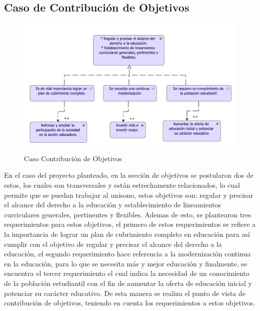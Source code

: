
\subsection{Caso  de Contribución de Objetivos}
\begin{figure}[h!]
	\centering
	\includegraphics[width=1.0\linewidth]{imgs/motivacion/contriObjetivos/contriObjetivos.pdf}
	\caption{Caso Contribución de Objetivos}
\end{figure}

En el caso del proyecto planteado, en la sección de objetivos se postularon dos de estos, los cuales son transversales y están estrechamente relacionados, lo cual permite que se puedan trabajar al unisono, estos objetivos son: regular y precisar el alcance del derecho a la educación y establecimiento de lineamientos curriculares generales, pertinentes y flexibles. Ademas de esto, se plantearon tres requerimientos para estos objetivos, el primero de estos requerimientos se refiere a la importancia de lograr un plan de cubrimiento completo en educación para así cumplir con el objetivo de regular y precisar el alcance del derecho a la educación, el segundo requerimiento hace referencia a la modernización continua en la educación, para lo que se necesita más y mejor educación y finalmente, se encuentra el tercer requerimiento el cual indica la necesidad de un conocimiento de la población estudiantil con el fin de aumentar la oferta de educación inicial y potenciar su carácter educativo. De esta manera se realiza el punto de vista de contribución de objetivos, teniendo en cuenta los requerimientos a estos objetivos.
